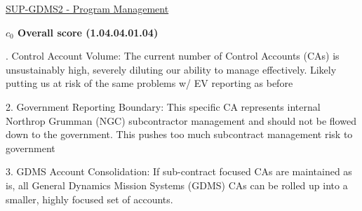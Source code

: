 % 


\begin{frame}{\href{run:../local/source-docs/1.04.04.01.04.pdf}{SUP-GDMS2 - Program Management}}
\centering
{}
\par
\vspace{0.75em}
\textbf{\small{\(c_0\) Overall score {\tiny (1.04.04.01.04)}}}\\\par
\vspace{0.5em}
\begin{minipage}{0.85\textwidth}
\raggedright
\fontsize{7}{9}. Control Account Volume: The current number of Control Accounts (CAs) is unsustainably high, severely diluting our ability to manage effectively. Likely putting us at risk of the same problems w/ EV reporting as before\par\vspace{0.5em}2. Government Reporting Boundary: This specific CA represents internal Northrop Grumman (NGC) subcontractor management and should not be flowed down to the government. This pushes too much subcontract management risk to government\par\vspace{0.5em}3. GDMS Account Consolidation: If sub-contract focused CAs are maintained as is, all General Dynamics Mission Systems (GDMS) CAs can be rolled up into a smaller, highly focused set of accounts.\par
\end{minipage}
\end{frame}
%
